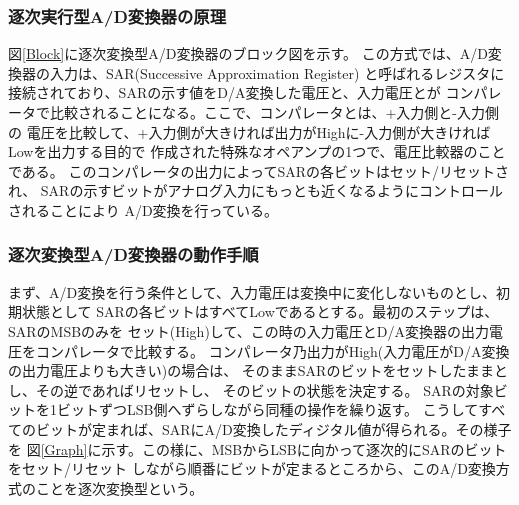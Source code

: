 \subsubsection{逐次実行型A/D変換器の原理}
図\ref{Block}に逐次変換型A/D変換器のブロック図を示す。
この方式では、A/D変換器の入力は、SAR(Successive Approximation Register)
と呼ばれるレジスタに接続されており、SARの示す値をD/A変換した電圧と、入力電圧とが
コンパレータで比較されることになる。ここで、コンパレータとは、+入力側と-入力側の
電圧を比較して、+入力側が大きければ出力がHighに-入力側が大きければLowを出力する目的で
作成された特殊なオペアンプの1つで、電圧比較器のことである。
このコンパレータの出力によってSARの各ビットはセット/リセットされ、
SARの示すビットがアナログ入力にもっとも近くなるようにコントロールされることにより
A/D変換を行っている。


\subsubsection{逐次変換型A/D変換器の動作手順}
まず、A/D変換を行う条件として、入力電圧は変換中に変化しないものとし、初期状態として
SARの各ビットはすべてLowであるとする。最初のステップは、SARのMSBのみを
セット(High)して、この時の入力電圧とD/A変換器の出力電圧をコンパレータで比較する。
コンパレータ乃出力がHigh(入力電圧がD/A変換の出力電圧よりも大きい)の場合は、
そのままSARのビットをセットしたままとし、その逆であればリセットし、
そのビットの状態を決定する。
SARの対象ビットを1ビットずつLSB側へずらしながら同種の操作を繰り返す。
こうしてすべてのビットが定まれば、SARにA/D変換したディジタル値が得られる。その様子を
図\ref{Graph}に示す。この様に、MSBからLSBに向かって逐次的にSARのビットをセット/リセット
しながら順番にビットが定まるところから、このA/D変換方式のことを逐次変換型という。


